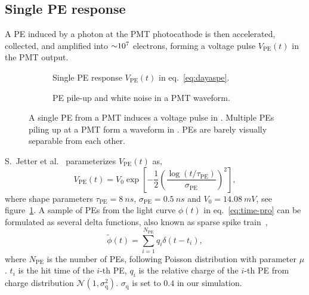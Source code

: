 \subsection{Single PE response}
\label{subsec:spe}

A PE induced by a photon at the PMT photocathode is then accelerated, collected, and amplified into $\num[retain-unity-mantissa=false]{\sim 1e7}$ electrons, forming a voltage pulse $V_\mathrm{PE}(t)$ in the PMT output.
\begin{figure}[H]
  \begin{subfigure}{.49\textwidth}
    \centering
    \resizebox{\textwidth}{!}{}
    \caption{\label{fig:spe} Single PE response $V_\mathrm{PE}(t)$ in eq.~\eqref{eq:dayaspe}.}
  \end{subfigure}
  \begin{subfigure}{.49\textwidth}
    \centering
    \resizebox{\textwidth}{!}{}
    \caption{\label{fig:pile} PE pile-up and white noise in a PMT waveform.}
  \end{subfigure}
  \caption{A single PE from a PMT induces a voltage pulse in .  Multiple PEs piling up at a PMT form a waveform in .  PEs are barely visually separable from each other.}
\end{figure}

S.~Jetter et al.~\cite{jetter_pmt_2012} parameterizes $V_\mathrm{PE}(t)$ as,
\begin{equation}
  V_\mathrm{PE}(t) = V_{0}\exp\left[-\frac{1}{2}\left(\frac{\log(t/\tau_\mathrm{PE})}{\sigma_\mathrm{PE}}\right)^{2}\right],
  \label{eq:dayaspe}
\end{equation}
where shape parameters $\tau_\mathrm{PE}=\SI{8}{ns}$, $\sigma_\mathrm{PE}=\SI{0.5}{ns}$ and $V_{0}=\SI{14.08}{mV}$, see figure~\ref{fig:spe}.  A sample of PEs from the light curve $\phi(t)$ in eq.~\eqref{eq:time-pro} can be formulated as several delta functions, also known as sparse spike train~\cite{levy_reconstruction_1981}, 
\begin{equation}
  \label{eq:lc-sample}
  \tilde{\phi}(t) = \sum_{i=1}^{N_{\mathrm{PE}}} q_i \delta(t-t_i),
\end{equation}
where $N_\mathrm{PE}$ is the number of PEs, following Poisson distribution with parameter $\mu$.  $t_i$ is the hit time of the $i$-th PE, $q_i$ is the relative charge of the $i$-th PE from charge distribution $\mathcal{N}(1,\sigma_\mathrm{q}^2)$.  $\sigma_\mathrm{q}$ is set to $0.4$ in our simulation.

